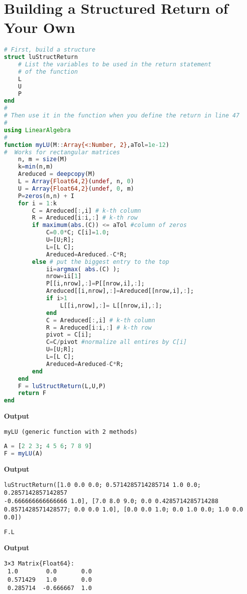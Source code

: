 \section{Building a Structured Return of Your Own}


\begin{lstlisting}[language=Julia,style=mystyle]
# First, build a structure
struct luStructReturn
    # List the variables to be used in the return statement
    # of the function
    L
    U
    P
end
#
# Then use it in the function when you define the return in line 47
#
using LinearAlgebra
#
function myLU(M::Array{<:Number, 2},aTol=1e-12)
#  Works for rectangular matrices  
    n, m = size(M)
    k=min(n,m)
    Areduced = deepcopy(M)
    L = Array{Float64,2}(undef, n, 0)
    U = Array{Float64,2}(undef, 0, m)
    P=zeros(n,n) + I     
    for i = 1:k
        C = Areduced[:,i] # k-th column
        R = Areduced[i:i,:] # k-th row
        if maximum(abs.(C)) <= aTol #column of zeros
            C=0.0*C; C[i]=1.0;
            U=[U;R];  
            L=[L C];
            Areduced=Areduced.-C*R;
        else # put the biggest entry to the top  
            ii=argmax( abs.(C) );
            nrow=ii[1] 
            P[[i,nrow],:]=P[[nrow,i],:];
            Areduced[[i,nrow],:]=Areduced[[nrow,i],:];
            if i>1
                L[[i,nrow],:]= L[[nrow,i],:];
            end
            C = Areduced[:,i] # k-th column
            R = Areduced[i:i,:] # k-th row
            pivot = C[i];
            C=C/pivot #normalize all entires by C[i]
            U=[U;R]; 
            L=[L C];
            Areduced=Areduced-C*R;
        end
    end
    F = luStructReturn(L,U,P)
    return F
end

\end{lstlisting}
\textbf{Output} 
\begin{verbatim}
myLU (generic function with 2 methods)
\end{verbatim}

\begin{lstlisting}[language=Julia,style=mystyle]
A = [2 2 3; 4 5 6; 7 8 9]
F = myLU(A)
\end{lstlisting}
\textbf{Output} 
\begin{verbatim}
luStructReturn([1.0 0.0 0.0; 0.5714285714285714 1.0 0.0; 0.2857142857142857
-0.666666666666666 1.0], [7.0 8.0 9.0; 0.0 0.4285714285714288
0.8571428571428577; 0.0 0.0 1.0], [0.0 0.0 1.0; 0.0 1.0 0.0; 1.0 0.0 0.0])
\end{verbatim}


\begin{lstlisting}[language=Julia,style=mystyle]
F.L
\end{lstlisting}
\textbf{Output} 
\begin{verbatim}
3×3 Matrix{Float64}:
 1.0        0.0       0.0
 0.571429   1.0       0.0
 0.285714  -0.666667  1.0
\end{verbatim}

